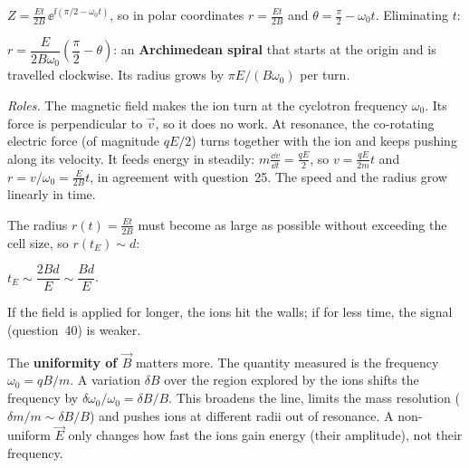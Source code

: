 \documentclass[11pt,a4paper]{article}
\newcommand{\vv}[1]{\vec{#1}}
\begin{document}
$Z = \frac{Et}{2B}\,\ee^{\ii(\pi/2-\omega_0t)}$, so in polar coordinates
$r = \frac{Et}{2B}$ and $\theta = \frac\pi2 - \omega_0t$. Eliminating $t$:
\begin{result}
$r = \dfrac{E}{2B\omega_0}\left(\dfrac\pi2 - \theta\right)$: an \textbf{Archimedean spiral}
that starts at the origin and is travelled clockwise. Its radius grows by $\pi E/(B\omega_0)$
per turn.
\end{result}
\begin{center}
\end{center}
\emph{Roles.} The magnetic field makes the ion turn at the cyclotron frequency $\omega_0$. Its
force is perpendicular to $\vv v$, so it does no work. At resonance, the co-rotating electric
force (of magnitude $qE/2$) turns together with the ion and keeps pushing along its velocity.
It feeds energy in steadily: $m\frac{\dd v}{\dd t} = \frac{qE}2$, so
$v = \frac{qE}{2m}t$ and $r = v/\omega_0 = \frac{E}{2B}t$, in agreement with question~25. The
speed and the radius grow linearly in time.

The radius $r(t) = \frac{Et}{2B}$ must become as large as possible without exceeding the cell
size, so $r(t_E)\sim d$:
\begin{result}
$t_E\sim\dfrac{2Bd}{E}\sim\dfrac{Bd}{E}$.
\end{result}
If the field is applied for longer, the ions hit the walls; if for less time, the signal
(question~40) is weaker.

The \textbf{uniformity of $\vv B$} matters more. The quantity measured is the frequency
$\omega_0 = qB/m$. A variation $\delta B$ over the region explored by the ions shifts the
frequency by $\delta\omega_0/\omega_0 = \delta B/B$. This broadens the line, limits the mass
resolution ($\delta m/m\sim\delta B/B$) and pushes ions at different radii out of resonance. A
non-uniform $\vv E$ only changes how fast the ions gain energy (their amplitude), not their
frequency.
\end{document}
